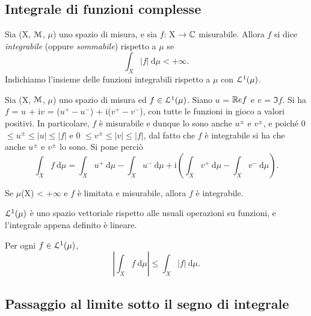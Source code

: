 \documentclass[Completo.tex]{subfiles}
\begin{document}
	\subsection{Integrale di funzioni complesse}
	\begin{Def}
		Sia (X, $\eu[M]$, $\mu$) uno spazio di misura, e sia $f$: X $\ra \bb[C]$ misurabile. Allora $f$ si dice \textit{integrabile} (oppure \textit{sommabile}) rispetto a $\mu$ se
		\begin{equation*}
		\int_X \vert f \vert \ \mathrm{d}\mu < +\infty.
		\end{equation*}
		Indichiamo l'insieme delle funzioni integrabili rispetto a $\mu$ con $\eu[L]^1(\mu)$.
	\end{Def}
	\begin{Def}
		Sia (X, $\eu[M]$, $\mu$) uno spazio di misura ed $f \in \eu[L]^1(\mu)$. Siano $u$ = $\bb[R]e f$ e $v$ = $\Im f$. Si ha $f$ = $u$ + i$v$ = ($u^{+} - u^{-}$) + i($v^{+} - v^{-}$), con tutte le funzioni in gioco a valori positivi. In particolare, $f$ è misurabile e dunque lo sono anche $u^{\pm}$ e $v^{\pm}$, e poiché 0 $\leq u^{\pm} \leq \vert u \vert \leq \vert f \vert$ e 0 $\leq v^{\pm} \leq \vert v \vert \leq \vert f \vert$, dal fatto che $f$ è integrabile si ha che anche $u^{\pm}$ e $v^{\pm}$ lo sono. Si pone perciò
		\begin{equation*}
		\int_X f \ \mathrm{d}\mu = \int_X u^{+} \ \mathrm{d}\mu - \int_X u^{-} \ \mathrm{d}\mu + \mathrm{i} \left( \int_X v^{+} \ \mathrm{d}\mu - \int_X v^{-} \ \mathrm{d}\mu \right).
		\end{equation*}
	\end{Def}
	\begin{Ex}
		Se $\mu$(X) < $+\infty$ e $f$ è limitata e misurabile, allora $f$ è integrabile.
	\end{Ex}
	\begin{Prop}
		$\eu[L]^1(\mu)$ è uno spazio vettoriale rispetto alle usuali operazioni su funzioni, e l'integrale appena definito è lineare.
	\end{Prop}
	\begin{Prop}
		Per ogni $f \in \eu[L]^1(\mu)$,
		\begin{equation*}
		\left\vert \int_X f \ \mathrm{d}\mu \right\vert \leq \int_X \vert f \vert \ \mathrm{d}\mu.
		\end{equation*}
	\end{Prop}
	\subsection{Passaggio al limite sotto il segno di integrale}
\end{document}
